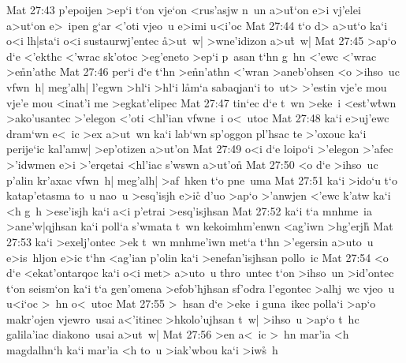 \vs Mat 27:43
p'epoijen
>ep`i
t`on
vje`on
<rus'asjw
n~un
a>u\r{t}`on
e>i
vj'elei
a>ut`on
e>~ipen
g`ar
<'oti
vjeo~u
e>imi
u<i'oc\bibvsend
\vs Mat 27:44
t`o
d>
a>ut`o
ka`i
o<i
lh|sta`i
o<i
sustaurwj'entec
\r{a}>ut~w|
>wne'idizon
a>u\r{t}~w|\bibvsend
{}
\vs Mat 27:45
>ap`o
d`e
<'ekthc
<'wrac
sk'otoc
>eg'eneto
>ep`i
p~asan
t`hn
g~hn
<'ewc
<'wrac
>e\r{n}n'athc\bibvsend
{}
\vs Mat 27:46
per`i
d`e
t`hn
>e\r{n}n'athn
<'wran
>aneb'ohsen
<o
>ihso~uc
vfwn~h|
meg'alh|
l'egwn
>hl`i
>hl`i
l\r{a}m`a
sabaqjan`i
to~ut>
>'estin
vje'e
mou
vje'e
mou
<inat'i
me
>egkat'elipec\bibvsend
\vs Mat 27:47
tin`ec
d`e
t~wn
>eke~i
<est'w\r{t}wn
>ako'usantec
>'elegon
<'oti
<hl'ian
vfwne~i
o<~utoc\bibvsend
\vs Mat 27:48
ka`i
e>uj'ewc
dram`wn
e<~ic
>ex
a>ut~wn
ka`i
lab`wn
sp'oggon
pl'hsac
te
>'oxouc
ka`i
perije`ic
kal'amw|
>ep'otizen
a>ut'on\bibvsend
\vs Mat 27:49
o<i
d`e
loipo`i
>'elegon
>'afec
>'idwmen
e>i
>'erqetai
<hl'iac
s'wswn
a>ut'o\r{n}\bibvsend
{}
\vs Mat 27:50
<o
d`e
>ihso~uc
p'alin
kr'axac
vfwn~h|
meg'alh|
>af~hken
t`o
pne~uma\bibvsend
\vs Mat 27:51
ka`i
>ido`u
t`o
katap'etasma
to~u
nao~u
>esq'isjh
e>ic\r{}
d'uo
>ap`o
>'anwjen
<'ewc
k'atw
ka`i
<h
g~h
>ese'isjh
ka`i
a<i
p'etrai
>esq'isjhsan\bibvsend
\vs Mat 27:52
ka`i
t`a
mnhme~ia
>ane'w|qjhsan
ka`i
poll`a
s'wmata
t~wn
kekoimhm'enwn
<ag'iwn
>hg'erj\r{h}\bibvsend
{}
\vs Mat 27:53
ka`i
>exelj'ontec
>ek
t~wn
mnhme'iwn
met`a
t`hn
>'egersin
a>uto~u
e>is~hljon
e>ic
t`hn
<ag'ian
p'olin
ka`i
>enefan'isjhsan
pollo~ic\bibvsend
\vs Mat 27:54
<o
d`e
<ekat'ontarqoc
ka`i
o<i
met>
a>uto~u
thro~untec
t`on
>ihso~un
>id'ontec
t`on
seism`on
ka`i
t`a
gen'omena
>efob'hjhsan
sf'odra
l'egontec
>alhj~wc
vjeo~u
u<i`oc
>~hn
o<~utoc\bibvsend
\vs Mat 27:55
>~hsan
d`e
>eke~i
guna~ikec
polla`i
>ap`o
makr'ojen
vjewro~usai
a<'itinec
>hkolo'ujhsan
t~w|
>ihso~u
>ap`o
t~hc
galila'iac
diakono~usai
a>ut~w|\bibvsend
\vs Mat 27:56
>en
a<~ic
>~hn
mar'ia
<h
magdalhn`h
ka`i
mar'ia
<h
to~u
>iak'wbou
ka`i
>iw\r{s}~h
